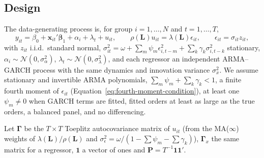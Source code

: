 \documentclass[12pt]{article}
\begin{document}
\subsection{Design}
The data-generating process is, for group $i=1,\dots,N$ and $t=1,\dots,T$,
\begin{equation}
y_{it}=\beta_0+\mathbf{x}_{it}'\boldsymbol{\beta}_1+\alpha_i+\lambda_t+u_{it},\qquad
\rho(\mathbf{L})u_{it}=\lambda(\mathbf{L})\epsilon_{it},\qquad
\epsilon_{it}=\sigma_{it}z_{it},
\end{equation}
with $z_{it}$ i.i.d.\ standard normal, $\sigma_{it}^2=\omega+\sum_m\psi_m\epsilon_{i,t-m}^2+\sum_k\gamma_k\sigma_{i,t-k}^2$ stationary, $\alpha_i\sim\mathcal N(0,\sigma_\alpha^2)$, $\lambda_t\sim\mathcal N(0,\sigma_\lambda^2)$, and each regressor an independent ARMA--GARCH process with the same dynamics and innovation variance $\sigma_x^2$. We assume stationary and invertible ARMA polynomials, $\sum_m\psi_m+\sum_k\gamma_k<1$, a finite fourth moment of $\epsilon_{it}$ (Equation~\ref{eq:fourth-moment-condition}), at least one $\psi_m\neq0$ when GARCH terms are fitted, fitted orders at least as large as the true orders, a balanced panel, and no differencing.

Let $\boldsymbol\Gamma$ be the $T\times T$ Toeplitz autocovariance matrix of $u_{it}$ (from the MA($\infty$) weights of $\lambda(\mathbf L)/\rho(\mathbf L)$ and $\sigma_\epsilon^2=\omega/(1-\sum\psi_m-\sum\gamma_k)$), $\boldsymbol\Gamma_x$ the same matrix for a regressor, $\mathbf 1$ a vector of ones and $\mathbf P=T^{-1}\mathbf 1\mathbf 1'$.
\end{document}
